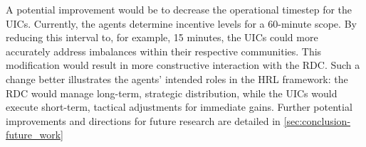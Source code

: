 A potential improvement would be to decrease the operational timestep for the UICs. Currently, the agents determine incentive levels for a 60-minute scope.
By reducing this interval to, for example, 15 minutes, the UICs could more accurately address imbalances within their respective communities.
This modification would result in more constructive interaction with the RDC.
Such a change better illustrates the agents' intended roles in the HRL framework: the RDC would manage long-term, strategic distribution, while the UICs would execute short-term, tactical adjustments for immediate gains.
Further potential improvements and directions for future research are detailed in \autoref{sec:conclusion-future_work}
